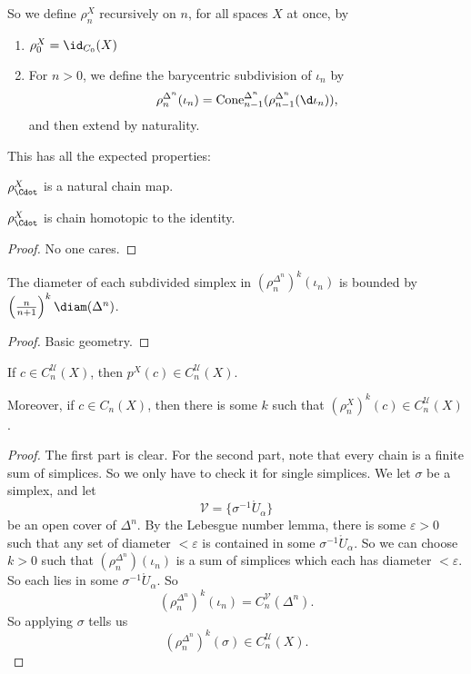 \documentclass[a4paper]{article}
\theoremstyle{definition}
\begin{document}
So we define $\rho_n^X$ recursively on $n$, for all spaces $X$ at once, by
\begin{enumerate}
  \item $\rho_0^X = \id_{C_0}(X)$
  \item For $n > 0$, we define the barycentric subdivision of $\iota_n$ by
    \[
      \rho_n^{\Delta^n}(\iota_n) = \mathrm{Cone}_{n - 1}^{\Delta^n} (\rho_{n - 1}^{\Delta^n} (\d \iota_n)),
    \]
    and then extend by naturality.
\end{enumerate}

This has all the expected properties:
\begin{lemma}
  $\rho_\Cdot^X$ is a natural chain map.
\end{lemma}

\begin{lemma}
  $\rho_\Cdot^X$ is chain homotopic to the identity.
\end{lemma}

\begin{proof}
  No one cares.
\end{proof}

\begin{lemma}
  The diameter of each subdivided simplex in $(\rho_n^{\Delta^n})^k(\iota_n)$ is bounded by $\left(\frac{n}{n + 1}\right)^k \diam(\Delta^n)$.
\end{lemma}

\begin{proof}
  Basic geometry.
\end{proof}

\begin{prop}
  If $c \in C_n^\mathcal{U}(X)$, then $p^X(c) \in C_n^{\mathcal{U}}(X)$.

  Moreover, if $c \in C_n(X)$, then there is some $k$ such that $(\rho_n^{X})^k(c) \in C_n^{\mathcal{U}}(X)$.
\end{prop}

\begin{proof}
  The first part is clear. For the second part, note that every chain is a finite sum of simplices. So we only have to check it for single simplices. We let $\sigma$ be a simplex, and let
  \[
    \mathcal{V} = \{\sigma^{-1} \mathring{U}_\alpha\}
  \]
  be an open cover of $\Delta^n$. By the Lebesgue number lemma, there is some $\varepsilon > 0$ such that any set of diameter $< \varepsilon$ is contained in some $\sigma^{-1} \mathring{U}_\alpha$. So we can choose $k > 0$ such that $(\rho_n^{\Delta^n}) (\iota_n)$ is a sum of simplices which each has diameter $< \varepsilon$. So each lies in some $\sigma^{-1}\mathring{U}_\alpha$. So
  \[
    (\rho_n^{\Delta^n})^k (\iota_n) = C_n^{\mathcal{V}} (\Delta^n).
  \]
  So applying $\sigma$ tells us
  \[
    (\rho_n^{\Delta^n})^k (\sigma) \in C_n^\mathcal{U}(X).
  \]
\end{proof}
\end{document}
